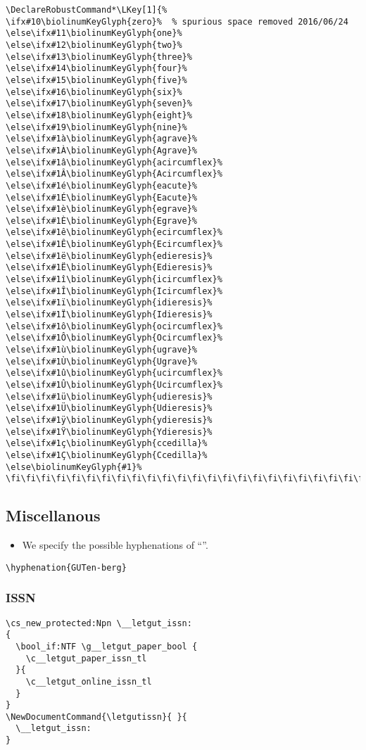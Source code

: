 \documentclass{letgut}
\begin{document}
\begin{lstlisting}
\DeclareRobustCommand*\LKey[1]{%
\ifx#10\biolinumKeyGlyph{zero}%  % spurious space removed 2016/06/24
\else\ifx#11\biolinumKeyGlyph{one}%
\else\ifx#12\biolinumKeyGlyph{two}%
\else\ifx#13\biolinumKeyGlyph{three}%
\else\ifx#14\biolinumKeyGlyph{four}%
\else\ifx#15\biolinumKeyGlyph{five}%
\else\ifx#16\biolinumKeyGlyph{six}%
\else\ifx#17\biolinumKeyGlyph{seven}%
\else\ifx#18\biolinumKeyGlyph{eight}%
\else\ifx#19\biolinumKeyGlyph{nine}%
\else\ifx#1à\biolinumKeyGlyph{agrave}%
\else\ifx#1À\biolinumKeyGlyph{Agrave}%
\else\ifx#1â\biolinumKeyGlyph{acircumflex}%
\else\ifx#1Â\biolinumKeyGlyph{Acircumflex}%
\else\ifx#1é\biolinumKeyGlyph{eacute}%
\else\ifx#1É\biolinumKeyGlyph{Eacute}%
\else\ifx#1è\biolinumKeyGlyph{egrave}%
\else\ifx#1È\biolinumKeyGlyph{Egrave}%
\else\ifx#1ê\biolinumKeyGlyph{ecircumflex}%
\else\ifx#1Ê\biolinumKeyGlyph{Ecircumflex}%
\else\ifx#1ë\biolinumKeyGlyph{edieresis}%
\else\ifx#1Ë\biolinumKeyGlyph{Edieresis}%
\else\ifx#1î\biolinumKeyGlyph{icircumflex}%
\else\ifx#1Î\biolinumKeyGlyph{Icircumflex}%
\else\ifx#1ï\biolinumKeyGlyph{idieresis}%
\else\ifx#1Ï\biolinumKeyGlyph{Idieresis}%
\else\ifx#1ô\biolinumKeyGlyph{ocircumflex}%
\else\ifx#1Ô\biolinumKeyGlyph{Ocircumflex}%
\else\ifx#1ù\biolinumKeyGlyph{ugrave}%
\else\ifx#1Ù\biolinumKeyGlyph{Ugrave}%
\else\ifx#1û\biolinumKeyGlyph{ucircumflex}%
\else\ifx#1Û\biolinumKeyGlyph{Ucircumflex}%
\else\ifx#1ü\biolinumKeyGlyph{udieresis}%
\else\ifx#1Ü\biolinumKeyGlyph{Udieresis}%
\else\ifx#1ÿ\biolinumKeyGlyph{ydieresis}%
\else\ifx#1Ÿ\biolinumKeyGlyph{Ydieresis}%
\else\ifx#1ç\biolinumKeyGlyph{ccedilla}%
\else\ifx#1Ç\biolinumKeyGlyph{Ccedilla}%
\else\biolinumKeyGlyph{#1}%
\fi\fi\fi\fi\fi\fi\fi\fi\fi\fi\fi\fi\fi\fi\fi\fi\fi\fi\fi\fi\fi\fi\fi\fi\fi\fi\fi\fi\fi\fi\fi\fi\fi\fi\fi\fi\fi\fi}
\end{lstlisting}

\subsection{Miscellanous}
\label{ImplementationMiscellanous-r11h55h0jlj0}
\begin{itemize}
\item We specify the possible hyphenations of \enquote{\gutenberg}.
\end{itemize}
\begin{lstlisting}
\hyphenation{GUTen-berg}
\end{lstlisting}

\subsubsection{ISSN}
\label{ImplementationMiscellanousISSN-cr1h55h0jlj0}
\begin{lstlisting}
\cs_new_protected:Npn \__letgut_issn:
{
  \bool_if:NTF \g__letgut_paper_bool {
    \c__letgut_paper_issn_tl
  }{
    \c__letgut_online_issn_tl
  }
}
\NewDocumentCommand{\letgutissn}{ }{
  \__letgut_issn:
}
\end{lstlisting}
\end{document}
